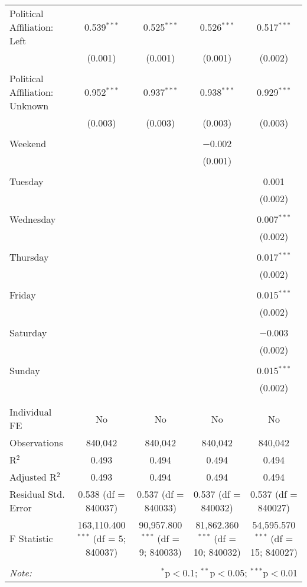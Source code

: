 \documentclass[
]{article}
\begin{document}
\begin{table}[!htbp]
{\begin{tabular}{@{\extracolsep{5pt}}lcccc}
 Political Affiliation: Left & 0.539$^{***}$ & 0.525$^{***}$ & 0.526$^{***}$ & 0.517$^{***}$ \\ 
  & (0.001) & (0.001) & (0.001) & (0.002) \\ 
  & & & & \\ 
 Political Affiliation: Unknown & 0.952$^{***}$ & 0.937$^{***}$ & 0.938$^{***}$ & 0.929$^{***}$ \\ 
  & (0.003) & (0.003) & (0.003) & (0.003) \\ 
  & & & & \\ 
 Weekend &  &  & $-$0.002 &  \\ 
  &  &  & (0.001) &  \\ 
  & & & & \\ 
 Tuesday &  &  &  & 0.001 \\ 
  &  &  &  & (0.002) \\ 
  & & & & \\ 
 Wednesday &  &  &  & 0.007$^{***}$ \\ 
  &  &  &  & (0.002) \\ 
  & & & & \\ 
 Thursday &  &  &  & 0.017$^{***}$ \\ 
  &  &  &  & (0.002) \\ 
  & & & & \\ 
 Friday &  &  &  & 0.015$^{***}$ \\ 
  &  &  &  & (0.002) \\ 
  & & & & \\ 
 Saturday &  &  &  & $-$0.003 \\ 
  &  &  &  & (0.002) \\ 
  & & & & \\ 
 Sunday &  &  &  & 0.015$^{***}$ \\ 
  &  &  &  & (0.002) \\ 
  & & & & \\ 
\hline \\[-1.8ex] 
Individual FE & No & No & No & No \\ 
Observations & 840,042 & 840,042 & 840,042 & 840,042 \\ 
R$^{2}$ & 0.493 & 0.494 & 0.494 & 0.494 \\ 
Adjusted R$^{2}$ & 0.493 & 0.494 & 0.494 & 0.494 \\ 
Residual Std. Error & 0.538 (df = 840037) & 0.537 (df = 840033) & 0.537 (df = 840032) & 0.537 (df = 840027) \\ 
F Statistic & 163,110.400$^{***}$ (df = 5; 840037) & 90,957.800$^{***}$ (df = 9; 840033) & 81,862.360$^{***}$ (df = 10; 840032) & 54,595.570$^{***}$ (df = 15; 840027) \\ 
\hline 
\hline \\[-1.8ex] 
\textit{Note:}  & \multicolumn{4}{r}{$^{*}$p$<$0.1; $^{**}$p$<$0.05; $^{***}$p$<$0.01} \\ 
\end{tabular}
} 
\end{table} 
\newpage
\end{document}
